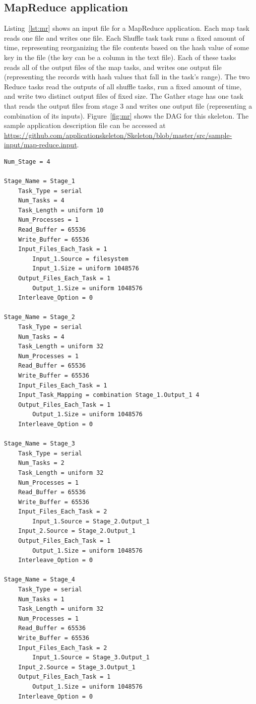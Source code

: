 \documentclass[10pt,a4paper]{article}
\begin{document}
\subsection{MapReduce application}
Listing~\ref{lst:mr} shows an input file for a MapReduce application.
Each map task reads one file and writes one file. 
Each Shuffle task task runs a fixed amount of time, representing reorganizing the file contents based on the hash value of some key in the file (the key can be a column in the text file). 
Each of these tasks reads all of the output files of the map tasks, and writes one output file (representing the records with hash values that fall in the task's range).
The two Reduce tasks read the outputs of all shuffle tasks, run a fixed amount of time, and write two distinct output files of fixed size. The Gather stage has one task that reads the output files from stage 3 and writes one output file (representing a combination of its inputs).
Figure~\ref{fig:mr} shows the DAG for this skeleton.
The sample application description file can be accessed at \url{https://github.com/applicationskeleton/Skeleton/blob/master/src/sample-input/map-reduce.input}.

\begin{lstlisting}[caption=Sample input for a MapReduce application, label=lst:mr, linewidth=1.0\textwidth, xleftmargin=2.5ex]
Num_Stage = 4

Stage_Name = Stage_1
    Task_Type = serial
    Num_Tasks = 4
    Task_Length = uniform 10
    Num_Processes = 1
    Read_Buffer = 65536
    Write_Buffer = 65536
    Input_Files_Each_Task = 1
        Input_1.Source = filesystem
        Input_1.Size = uniform 1048576
    Output_Files_Each_Task = 1
        Output_1.Size = uniform 1048576
    Interleave_Option = 0

Stage_Name = Stage_2
    Task_Type = serial
    Num_Tasks = 4
    Task_Length = uniform 32
    Num_Processes = 1
    Read_Buffer = 65536
    Write_Buffer = 65536
    Input_Files_Each_Task = 1
    Input_Task_Mapping = combination Stage_1.Output_1 4
    Output_Files_Each_Task = 1
        Output_1.Size = uniform 1048576
    Interleave_Option = 0

Stage_Name = Stage_3
    Task_Type = serial
    Num_Tasks = 2
    Task_Length = uniform 32
    Num_Processes = 1
    Read_Buffer = 65536
    Write_Buffer = 65536
    Input_Files_Each_Task = 2
        Input_1.Source = Stage_2.Output_1
	Input_2.Source = Stage_2.Output_1
    Output_Files_Each_Task = 1
        Output_1.Size = uniform 1048576
    Interleave_Option = 0

Stage_Name = Stage_4
    Task_Type = serial
    Num_Tasks = 1
    Task_Length = uniform 32
    Num_Processes = 1
    Read_Buffer = 65536
    Write_Buffer = 65536
    Input_Files_Each_Task = 2
        Input_1.Source = Stage_3.Output_1
	Input_2.Source = Stage_3.Output_1
    Output_Files_Each_Task = 1
        Output_1.Size = uniform 1048576
    Interleave_Option = 0

\end{lstlisting}
\end{document}
